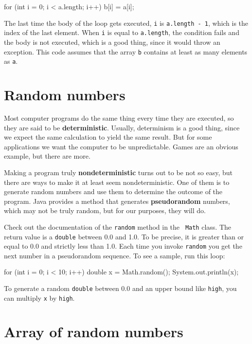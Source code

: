 \begin{code}
    for (int i = 0; i < a.length; i++) {
        b[i] = a[i];
    }
\end{code}
%
The last time the body of the loop gets executed, {\tt i}
is {\tt a.length - 1}, which is the index of the last element.  When
{\tt i} is equal to {\tt a.length}, the condition fails and the body
is not executed, which is a good thing, since it would throw an
exception.  This code assumes that the array {\tt b} contains at least
as many elements as {\tt a}.


\section{Random numbers}
\label{random}
\label{pseudorandom}

Most computer programs do the same thing every time they are executed,
so they are said to be {\bf deterministic}.  Usually, determinism is a
good thing, since we expect the same calculation to yield the same
result.  But for some applications we want the
computer to be unpredictable.  Games are an obvious example, but
there are more.

Making a program truly {\bf nondeterministic} turns out to be not so
easy, but there are ways to make it at least seem nondeterministic.
One of them is to generate random numbers and use them to determine
the outcome of the program.  Java provides a method that generates
{\bf pseudorandom} numbers, which may not be truly random, but for our
purposes, they will do.

Check out the documentation of the {\tt random} method in the {\tt
Math} class.  The return value is a {\tt double} between 0.0 and 1.0.
To be precise, it is greater than or equal to 0.0 and strictly less
than 1.0.  Each time you invoke {\tt random} you get the next
number in a pseudorandom sequence.
To see a sample, run this loop:

\begin{code}
    for (int i = 0; i < 10; i++) {
        double x = Math.random();
        System.out.println(x);
    }
\end{code}
%
To generate a random {\tt double} between 0.0 and an upper bound like
{\tt high}, you can multiply {\tt x} by {\tt high}.


\section{Array of random numbers}
\label{randarray}

